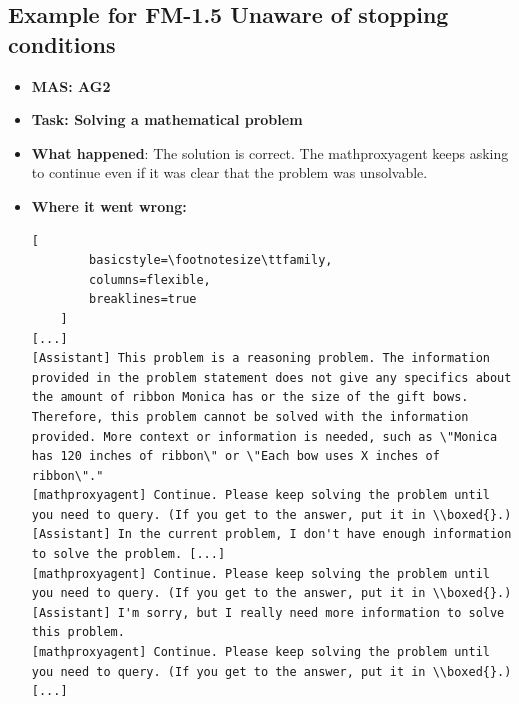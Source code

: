 \subsection{Example for FM-1.5 Unaware of stopping conditions}\label{ex:fm1.5}
\begin{itemize}
    \item \textbf{MAS: AG2} 
    \item \textbf{Task: Solving a mathematical problem} 
    \item \textbf{What happened}: The solution is correct. The mathproxyagent keeps asking to continue even if it was clear that the problem was unsolvable. 
    \item \textbf{Where it went wrong:}
    \begin{lstlisting}[
        basicstyle=\footnotesize\ttfamily,
        columns=flexible,
        breaklines=true
    ]
[...]
[Assistant] This problem is a reasoning problem. The information provided in the problem statement does not give any specifics about the amount of ribbon Monica has or the size of the gift bows. Therefore, this problem cannot be solved with the information provided. More context or information is needed, such as \"Monica has 120 inches of ribbon\" or \"Each bow uses X inches of ribbon\"."
[mathproxyagent] Continue. Please keep solving the problem until you need to query. (If you get to the answer, put it in \\boxed{}.)
[Assistant] In the current problem, I don't have enough information to solve the problem. [...]
[mathproxyagent] Continue. Please keep solving the problem until you need to query. (If you get to the answer, put it in \\boxed{}.)
[Assistant] I'm sorry, but I really need more information to solve this problem. 
[mathproxyagent] Continue. Please keep solving the problem until you need to query. (If you get to the answer, put it in \\boxed{}.)
[...]
    \end{lstlisting}
\end{itemize}



